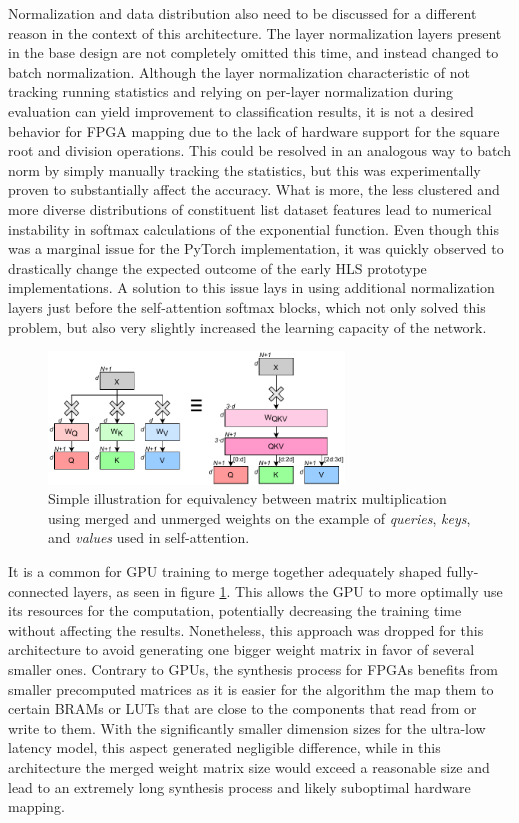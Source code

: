 Normalization and data distribution also need to be discussed for a different reason in the context of this architecture. The layer normalization layers present in the base design are not completely omitted this time, and instead changed to batch normalization. Although the layer normalization characteristic of not tracking running statistics and relying on per-layer normalization during evaluation can yield improvement to classification results, it is not a desired behavior for FPGA mapping due to the lack of hardware support for the square root and division operations. This could be resolved in an analogous way to batch norm by simply manually tracking the statistics, but this was experimentally proven to substantially affect the accuracy. What is more, the less clustered and more diverse distributions of constituent list dataset features lead to numerical instability in softmax calculations of the exponential function. Even though this was a marginal issue for the PyTorch implementation, it was quickly observed to drastically change the expected outcome of the early HLS prototype implementations. A solution to this issue lays in using additional normalization layers just before the self-attention softmax blocks, which not only solved this problem, but also very slightly increased the learning capacity of the network.

\begin{figure}[hpt!]
  \centering
  \includegraphics[trim={0cm 0cm 0cm 0cm}, width=0.7\textwidth, center]{models/weight_merging.pdf}
  \caption{Simple illustration for equivalency between matrix multiplication using merged and unmerged weights on the example of \textit{queries}, \textit{keys}, and \textit{values} used in self-attention.}
  \label{fig:weight-merging}
\end{figure}

It is a common for GPU training to merge together adequately shaped fully-connected layers, as seen in figure \ref{fig:weight-merging}. This allows the GPU to more optimally use its resources for the computation, potentially decreasing the training time without affecting the results. Nonetheless, this approach was dropped for this architecture to avoid generating one bigger weight matrix in favor of several smaller ones. Contrary to GPUs, the synthesis process for FPGAs benefits from smaller precomputed matrices as it is easier for the algorithm the map them to certain BRAMs or LUTs that are close to the components that read from or write to them. With the significantly smaller dimension sizes for the ultra-low latency model, this aspect generated negligible difference, while in this architecture the merged weight matrix size would exceed a reasonable size and lead to an extremely long synthesis process and likely suboptimal hardware mapping.


